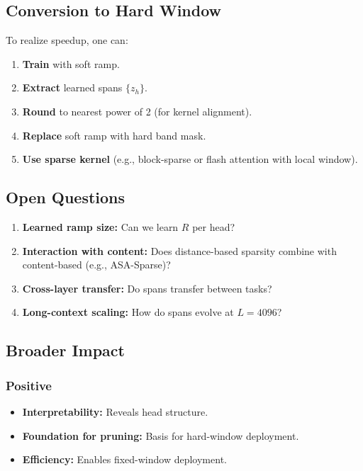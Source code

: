 \subsection{Conversion to Hard Window}

To realize speedup, one can:

\begin{enumerate}
\item \textbf{Train} with soft ramp.
\item \textbf{Extract} learned spans $\{z_h\}$.
\item \textbf{Round} to nearest power of 2 (for kernel alignment).
\item \textbf{Replace} soft ramp with hard band mask.
\item \textbf{Use sparse kernel} (e.g., block-sparse or flash attention with local window).

\end{enumerate}
\subsection{Open Questions}

\begin{enumerate}
\item \textbf{Learned ramp size:} Can we learn $R$ per head?
\item \textbf{Interaction with content:} Does distance-based sparsity combine with
  content-based (e.g., ASA-Sparse)?
\item \textbf{Cross-layer transfer:} Do spans transfer between tasks?
\item \textbf{Long-context scaling:} How do spans evolve at $L = 4096$?

\end{enumerate}
\subsection{Broader Impact}

\subsubsection{Positive}
\begin{itemize}
\item \textbf{Interpretability:} Reveals head structure.
\item \textbf{Foundation for pruning:} Basis for hard-window deployment.
\item \textbf{Efficiency:} Enables fixed-window deployment.

\end{itemize}

